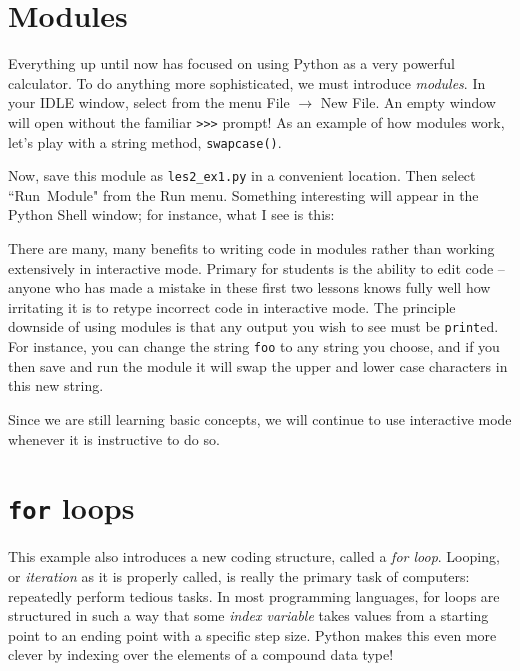 \documentclass[m3380-lec-main.tex]{subfiles}
\begin{document}
\section{Modules} Everything up until now has focused on using Python as a very powerful calculator. To do anything more sophisticated, we must introduce \emph{modules}. In your IDLE window, select from the menu {File $\to$ New File}. An empty window will open without the familiar \verb|>>>| prompt! As an example of how modules work, let's play with a string method, \verb|swapcase()|.\medskip


\smallskip\noindent
Now, save this module as \verb|les2_ex1.py| in a convenient location. Then select ``Run~Module" from the Run menu. Something interesting will appear in the Python Shell window; for instance, what I see is this:\smallskip


\noindent There are many, many benefits to writing code in modules rather than working extensively in interactive mode. Primary for students is the ability to edit code -- anyone who has made a mistake in these first two lessons knows fully well how irritating it is to retype incorrect code in interactive mode. The principle downside of using modules is that any output you wish to see must be \verb|print|ed. For instance, you can change the string \verb|foo| to any string you choose, and if you then save and run the module it will swap the upper and lower case characters in this new string.

Since we are still learning basic concepts, we will continue to use interactive mode whenever it is instructive to do so.

\section{\texttt{for} loops}
This example also introduces a new coding structure, called a \emph{for loop}. Looping, or \emph{iteration} as it is properly called, is really the primary task of computers: repeatedly perform tedious tasks. In most programming languages, for loops are structured in such a way that some \emph{index variable} takes values from a starting point to an ending point with a specific step size. Python makes this even more clever by indexing over the elements of a compound data type!
\end{document}
